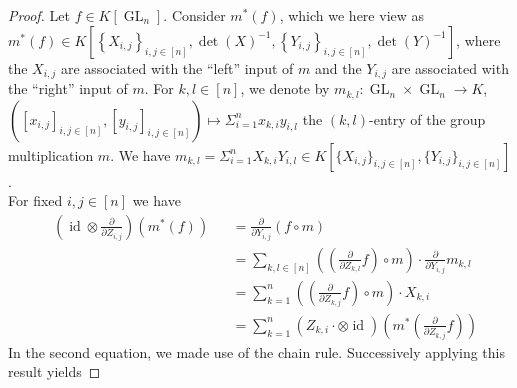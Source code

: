 \begin{proof}
  Let $f \in K \left\lbrack \operatorname{GL}_n \right\rbrack $.
  Consider $m^\ast(f)$, which we here view as \linebreak$ m^\ast(f) \in K \left\lbrack \left\{ X_{i,j} \right\}_{i,j \in [ n ]} , \operatorname{det} \left( X \right)^{-1} , \left\{ Y_{i,j} \right\}_{i,j \in [ n ]} , \operatorname{det} \left( Y \right)^{-1} \right\rbrack $, where the $X_{i,j}$ are associated with the ``left'' input of $m$ and the $Y_{i,j}$ are associated with the ``right'' input of $m$.
    For $k,l \in [n]$, we denote by $m_{k,l} \colon \operatorname{GL}_n \times \operatorname{GL}_n \rightarrow K$, $([x_{i,j}]_{i,j \in [n]},[y_{i,j}]_{i,j \in [n]}) \mapsto \Sigma_{i=1}^n x_{k,i}y_{i,l}$ the $(k,l)$-entry of the group multiplication $m$.
  We have $m_{k,l} = \Sigma_{i=1}^n X_{k,i}Y_{i,l} \in K[\{X_{i,j}\}_{i,j\in[n]},\{Y_{i,j}\}_{i,j\in[n]}]$.  \\
  For fixed $i,j \in [ n ] $ we have
  \begin{equation}
    \begin{aligned}
    &\left( \operatorname{id} \otimes \frac{\partial}{\partial Z_{i,j}} \right) \left( m^\ast \left( f \right) \right)
    &&= \frac{\partial}{\partial Y_{i,j}} \left( f \circ m \right)\\
    &&&= \sum_{k,l \in [ n ]} \left( \left( \frac{\partial}{\partial Z_{k,l}} f \right) \circ m \right) \cdot \frac{\partial}{\partial Y_{i,j}} m_{k,l} \\
    &&&= \sum_{k = 1}^n \left( \left( \frac{\partial}{\partial Z_{k,j}} f \right) \circ m \right) \cdot X_{k,i}\\
    &&&= \sum_{k=1}^n \left( Z_{k,i} {\cdot} \otimes \operatorname{id} \right) \left( m^\ast \left( \frac{\partial}{\partial Z_{k,j}} f \right) \right)
    \end{aligned}
  \end{equation}
  In the second equation, we made use of the chain rule.
  Successively applying this result yields

\end{proof}
